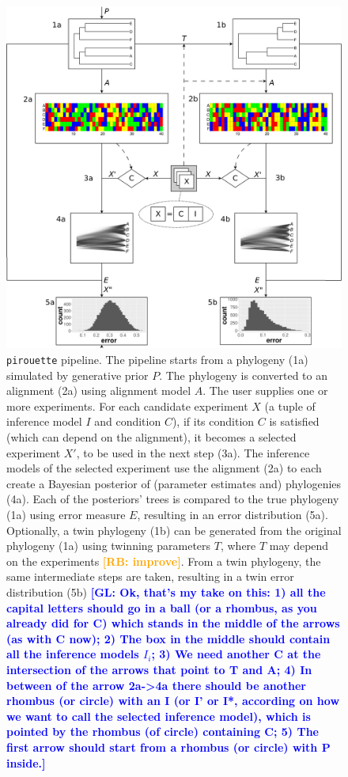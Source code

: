 \documentclass{article}
\newcommand{\giovanni}[1]{\textcolor{blue}{\textbf{[GL: #1]}}}
\newcommand{\richel}[1]{\textcolor{orange}{\textbf{[RB: #1]}}}
\begin{document}
\begin{figure}
  \centering
  \includegraphics[width=\textwidth]{workflow.png}
  \caption{
    \texttt{pirouette} pipeline. 
    The pipeline starts from a phylogeny (1a) simulated by generative prior 
$\mathit{P}$.
    The phylogeny is converted to an alignment (2a) using alignment model 
$\mathit{A}$. 
    The user supplies one or more experiments.
    For each candidate experiment $\mathit{X}$ 
    (a tuple of inference model $\mathit{I}$ and condition $\mathit{C}$),
    if its condition $\mathit{C}$ is 
    satisfied (which can depend on the alignment), 
    it becomes a selected experiment $\mathit{X'}$, 
    to be used in the next step (3a).
    The inference models of the selected experiment use the alignment (2a) 
    to each create a Bayesian posterior of (parameter estimates and) 
    phylogenies (4a). 
    Each of the posteriors' trees is compared to the true phylogeny (1a) 
    using error measure $\mathit{E}$, 
    resulting in an error distribution (5a). 
    Optionally, a twin phylogeny (1b) can be generated from the original 
    phylogeny (1a) using twinning parameters $T$, where $T$ may depend on
    the experiments \richel{improve}.
    From a twin phylogeny, the same intermediate steps are taken,
    resulting in a twin error distribution (5b)
    \giovanni{Ok, that's my take on this: 1) all the capital letters should go 
in a ball (or a rhombus, as you already did for C) which stands in the middle 
of the arrows (as with C now); 2) The box in the middle should contain all the 
inference models $I_{i}$; 3) We need another C at the intersection of the 
arrows that point to T and A; 4) In between of the arrow 2a->4a there should be 
another rhombus (or circle) with an I (or I' or I*, according on how we want to 
call the selected inference model), which is pointed by the rhombus (of circle) 
containing C; 5) The first arrow should start from a rhombus (or circle) with P 
inside.}
  }
  \label{fig:pipeline}
\end{figure}
\end{document}

